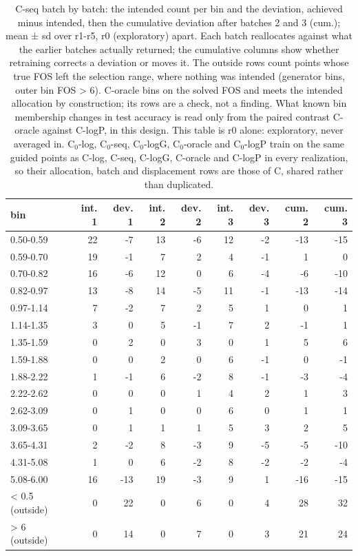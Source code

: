 \begin{table}[htbp]
\centering
\small
\setlength{\tabcolsep}{4pt}
\caption{C-seq batch by batch: the intended count per bin and the deviation, achieved minus intended, then the cumulative deviation after batches 2 and 3 (cum.); mean ± sd over r1-r5, r0 (exploratory) apart. Each batch reallocates against what the earlier batches actually returned; the cumulative columns show whether retraining corrects a deviation or moves it. The outside rows count points whose true FOS left the selection range, where nothing was intended (generator bins, outer bin FOS > 6). C-oracle bins on the solved FOS and meets the intended allocation by construction; its rows are a check, not a finding. What known bin membership changes in test accuracy is read only from the paired contrast C-oracle against C-logP, in this design. This table is r0 alone: exploratory, never averaged in. C$_0$-log, C$_0$-seq, C$_0$-logG, C$_0$-oracle and C$_0$-logP train on the same guided points as C-log, C-seq, C-logG, C-oracle and C-logP in every realization, so their allocation, batch and displacement rows are those of C, shared rather than duplicated.}
\label{tab:structural:batches:r0}
\begin{tabular}{lrrrrrrrr}
\toprule
bin & int. 1 & dev. 1 & int. 2 & dev. 2 & int. 3 & dev. 3 & cum. 2 & cum. 3 \\
\midrule
0.50-0.59 & 22 & -7 & 13 & -6 & 12 & -2 & -13 & -15 \\
0.59-0.70 & 19 & -1 & 7 & 2 & 4 & -1 & 1 & 0 \\
0.70-0.82 & 16 & -6 & 12 & 0 & 6 & -4 & -6 & -10 \\
0.82-0.97 & 13 & -8 & 14 & -5 & 11 & -1 & -13 & -14 \\
0.97-1.14 & 7 & -2 & 7 & 2 & 5 & 1 & 0 & 1 \\
1.14-1.35 & 3 & 0 & 5 & -1 & 7 & 2 & -1 & 1 \\
1.35-1.59 & 0 & 2 & 0 & 3 & 0 & 1 & 5 & 6 \\
1.59-1.88 & 0 & 0 & 2 & 0 & 6 & -1 & 0 & -1 \\
1.88-2.22 & 1 & -1 & 6 & -2 & 8 & -1 & -3 & -4 \\
2.22-2.62 & 0 & 0 & 0 & 1 & 4 & 2 & 1 & 3 \\
2.62-3.09 & 0 & 1 & 0 & 0 & 6 & 0 & 1 & 1 \\
3.09-3.65 & 0 & 1 & 1 & 1 & 5 & 3 & 2 & 5 \\
3.65-4.31 & 2 & -2 & 8 & -3 & 9 & -5 & -5 & -10 \\
4.31-5.08 & 1 & 0 & 6 & -2 & 8 & -2 & -2 & -4 \\
5.08-6.00 & 16 & -13 & 19 & -3 & 9 & 1 & -16 & -15 \\
< 0.5 (outside) & 0 & 22 & 0 & 6 & 0 & 4 & 28 & 32 \\
> 6 (outside) & 0 & 14 & 0 & 7 & 0 & 3 & 21 & 24 \\
\bottomrule
\end{tabular}
\end{table}
